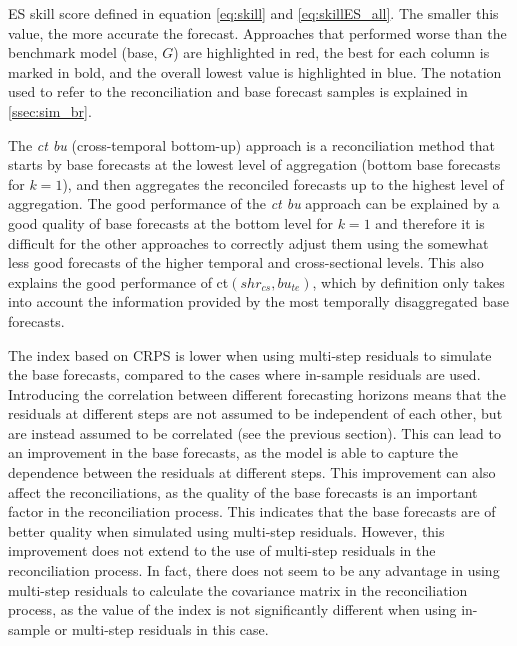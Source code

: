 \documentclass[a4paper,11pt]{article}
\theoremstyle{definition}
\begin{document}
\begin{table}[p]
	\centering
	\begingroup
	\fontsize{9}{11}\selectfont
	
	\endgroup
	\caption{ES skill score defined in equation \eqref{eq:skill} and \eqref{eq:skillES_all}. The smaller this value, the more accurate the forecast. Approaches that performed worse than the benchmark model (base, $G$) are highlighted in red, the best for each column is marked in bold, and the overall lowest value is highlighted in blue. The notation used to refer to the reconciliation and base forecast samples is explained in \autoref{ssec:sim_br}.}
	\label{tab:ar2es}
\end{table}

The \textit{ct bu} (cross-temporal bottom-up) approach is a reconciliation method that starts by base forecasts at the lowest level of aggregation (bottom base forecasts for $k = 1$), and then aggregates the reconciled forecasts up to the highest level of aggregation. The good performance of the \textit{ct bu} approach can be explained by a good quality of base forecasts at the bottom level for $k=1$ and therefore it is difficult for the other approaches to correctly adjust them using the somewhat less good forecasts of the higher temporal and cross-sectional levels. This also explains the good performance of ct$(shr_{cs}, bu_{te})$, which by definition only takes into account the information provided by the most temporally disaggregated base forecasts.

The index based on CRPS is lower when using multi-step residuals to simulate the base forecasts, compared to the cases where in-sample residuals are used. Introducing the correlation between different forecasting horizons means that the residuals at different steps are not assumed to be independent of each other, but are instead assumed to be correlated (see the previous section). This can lead to an improvement in the base forecasts, as the model is able to capture the dependence between the residuals at different steps. This improvement can also affect the reconciliations, as the quality of the base forecasts is an important factor in the reconciliation process. This indicates that the base forecasts are of better quality when simulated using multi-step residuals. However, this improvement does not extend to the use of multi-step residuals in the reconciliation process. In fact, there does not seem to be any advantage in using multi-step residuals to calculate the covariance matrix in the reconciliation process, as the value of the index is not significantly different when using in-sample or multi-step residuals in this case.
\end{document}
